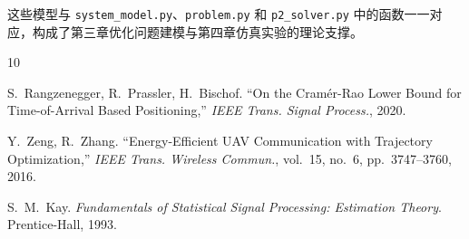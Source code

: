 这些模型与 \texttt{system\_model.py}、\texttt{problem.py} 和 \texttt{p2\_solver.py} 中的函数一一对应，构成了第三章优化问题建模与第四章仿真实验的理论支撑。

\begin{thebibliography}{10}

S.~Rangzenegger, R.~Prassler, H.~Bischof.
``On the Cram\'{e}r-Rao Lower Bound for Time-of-Arrival Based Positioning,''
\textit{IEEE Trans. Signal Process.}, 2020.

Y.~Zeng, R.~Zhang.
``Energy-Efficient UAV Communication with Trajectory Optimization,''
\textit{IEEE Trans. Wireless Commun.}, vol.~15, no.~6, pp.~3747--3760, 2016.

S.~M.~Kay.
\textit{Fundamentals of Statistical Signal Processing: Estimation Theory}.
Prentice-Hall, 1993.

\end{thebibliography}

